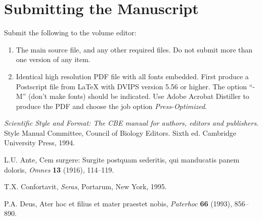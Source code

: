 \documentclass{IOS-Book-Article}
\begin{document}
\section{Submitting the Manuscript}
Submit the following to the volume editor:

\begin{enumerate}
\item The main source file, and any other required files. Do not submit more than
one version of any item.

\item Identical high resolution PDF file with all fonts embedded. First produce a
Postscript file from \LaTeX{} with DVIPS version 5.56 or higher. The option
``-M'' (don't make fonts) should be indicated. Use Adobe Acrobat Distiller to
produce the PDF and choose the job option \textit{Press-Optimized}.
\end{enumerate}

\begin{thebibliography}{99}

\textit{Scientific Style and Format: The CBE manual for authors,
editors and publishers}. Style Manual Committee, Council of Biology Editors.
Sixth ed. Cambridge University Press, 1994.

L.U. Ante, Cem surgere: Surgite postquam sederitis, qui manducatis panem doloris,
\textit{Omnes} \textbf{13} (1916), 114--119.

T.X. Confortavit, \textit{Seras}, Portarum, New York, 1995.

P.A. Deus, Ater hoc et filius et mater praestet nobis,
\textit{Paterhoc} \textbf{66} (1993), 856--890.

\end{thebibliography}
\end{document}

